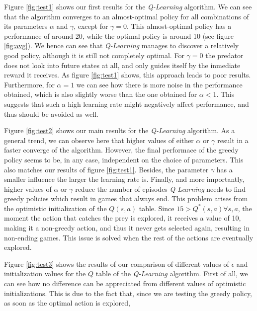 \documentclass[a4paper,10pt]{article}
\begin{document}
Figure \ref{fig:test1} shows our first results for the \textit{Q-Learning} algorithm. We can see that the algorithm converges to an almost-optimal policy for all combinations of its parameters $\alpha$ and $\gamma$, except for $\gamma = 0$. This almost-optimal policy has a performance of around 20, while the optimal policy is around 10 (see figure \ref{fig:avg}). We hence can see that \textit{Q-Learning} manages to discover a relatively good policy, although it is still not completely optimal. For $\gamma = 0$ the predator does not look into future states at all, and only guides itself by the inmediate reward it receives. As figure \ref{fig:test1} shows, this approach leads to poor results. Furthermore, for $\alpha = 1$ we can see how there is more noise in the performance obtained, which is also slightly worse than the one obtained for $\alpha < 1$. This suggests that such a high learning rate might negatively affect performance, and thus should be avoided as well.

Figure \ref{fig:test2} shows our main results for the \textit{Q-Learning} algorithm. As a general trend, we can observe here that higher values of either $\alpha$ or $\gamma$ result in a faster converge of the algorithm. However, the final performace of the greedy policy seems to be, in any case, independent on the choice of parameters. This also matches our results of figure \ref{fig:test1}. Besides, the parameter $\gamma$ has a smaller influence the larger the learning rate is. Finally, and more importantly, higher values of $\alpha$ or $\gamma$ reduce the number of episodes \textit{Q-Learning} needs to find greedy policies which result in games that always end. This problem arises from the optimistic initialization of the $Q(s, a)$ table. Since $15 > Q^*(s, a) \forall s, a$, the moment the action that catches the prey is explored, it receives a value of 10, making it a non-greedy action, and thus it never gets selected again, resulting in non-ending games. This issue is solved when the rest of the actions are eventually explored.

Figure \ref{fig:test3} shows the results of our comparison of different values of $\epsilon$ and initialization values for the $Q$ table of the \textit{Q-Learning} algorithm. First of all, we can see how no difference can be appreciated from different values of optimistic initializations. This is due to the fact that, since we are testing the greedy policy, as soon as the optimal action is explored, %
\end{document}
